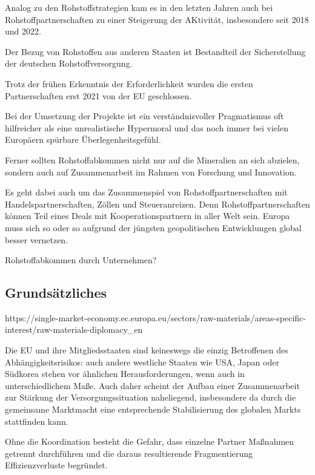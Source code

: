 \documentclass[12pt,a4paper,oneside]{book} %
\begin{document}
{Analog zu den Rohstoffstrategien kam es in den letzten Jahren auch bei Rohstoffpartnerschaften zu einer Steigerung der AKtivität, insbesondere seit 2018 und 2022.

Der Bezug von Rohstoffen aus anderen Staaten ist Bestandteil der Sicherstellung der deutschen Rohstoffversorgung.\autocite{Frenz 2025, S. 1035ff.}

Trotz der frühen Erkenntnis der Erforderlichkeit wurden die ersten Partnerschaften erst 2021 von der EU geschlossen.

\glqq Bei der Umsetzung der Projekte ist ein verständnisvoller Pragmatismus oft hilfreicher als eine unrealistische Hypermoral und das noch immer bei vielen Europäern spürbare Überlegenheitsgefühl.\grqq \autocite{https://www.africa-business-guide.de/de/praxis/erfahrungen/schluesselrolle-afrikas-bedeutung-bei-den-kritischen-rohstoffen--1920084}

Ferner sollten Rohstoffabkommen nicht nur auf die Mineralien an sich abzielen, sondern auch auf Zusammenarbeit im Rahmen von Forschung und Innovation.\autocite{ÖAW}

Es geht dabei auch um das Zusammenspiel von Rohstoffpartnerschaften mit Handelspartnerschaften, Zöllen und Steueranreizen. Denn Rohstoffpartnerschaften können Teil eines Deals mit Kooperationspartnern in aller Welt sein. Europa muss sich so oder so aufgrund der jüngsten geopolitischen Entwicklungen global besser vernetzen.

Rohstoffabkommen durch Unternehmen?

\subsection{Grundsätzliches}

https://single-market-economy.ec.europa.eu/sectors/raw-materials/areas-specific-interest/raw-materials-diplomacy_en

Die EU und ihre Mitgliedsstaaten sind keineswegs die einzig Betroffenen des Abhängigkeitsrisikos: auch andere westliche Staaten wie USA, Japan oder Südkorea stehen vor ähnlichen Herausforderungen, wenn auch in unterschiedlichem Maße. Auch daher scheint der Aufbau einer Zusammenarbeit zur Stärkung der Versorgungssituation naheliegend, insbesondere da durch die gemeinsame Marktmacht eine entsprechende Stabilisierung des globalen Markts stattfinden kann.




Ohne die Koordination besteht die Gefahr, dass einzelne Partner Maßnahmen getrennt durchführen und die daraus resultierende Fragmentierung Effizienzverluste begründet.

}
\end{document}
